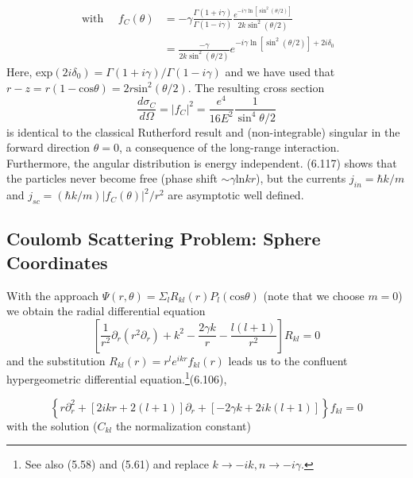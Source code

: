 \begin{equation}
\begin{aligned} \text { with } \quad f_{C}(\theta) &=-\gamma \frac{\Gamma(1+i \gamma)}{\Gamma(1-i \gamma)} \frac{e^{-i \gamma \ln \left[\sin ^{2}(\theta / 2)\right]}}{2 k \sin ^{2}(\theta / 2)} \\ &=\frac{-\gamma}{2 k \sin ^{2}(\theta / 2)} e^{-i \gamma \ln \left[\sin ^{2}(\theta / 2)\right]+2 i \delta_{0}} \end{aligned}
\end{equation}
Here, exp$ (2i\delta_0) = \Gamma (1 + i\gamma) / \Gamma (1 - i\gamma)$ and we have used that $r - z = r (1 - \text{cos} \theta) = 2r \text{sin}^2 (\theta / 2)$. The resulting cross section
\begin{equation}
    \frac{d \sigma_{C}}{d \Omega}=\left|f_{C}\right|^{2}=\frac{e^{4}}{16 E^{2}} \frac{1}{\sin ^{4} \theta / 2}
    \end{equation}
is identical to the classical Rutherford result and (non-integrable) singular in the forward direction $\theta = 0$, a consequence of the long-range interaction. Furthermore, the angular distribution is energy independent. (6.117) shows that the particles never become free (phase shift $\sim\gamma \text{ln} kr$), but the currents $j_{in} = \hbar k / m$ and $j_{sc} = (\hbar k / m) | f_C (\theta) |^2 / r^2$ are asymptotic well defined.

\subsection{Coulomb Scattering Problem: Sphere Coordinates}
With the approach $\Psi (r, \theta) = \Sigma_l R_{kl} (r) P_l (\text{cos}\theta)$ (note that we choose $m = 0$) we obtain the radial differential equation
\begin{equation}
    \left[\frac{1}{r^{2}} \partial_{r}\left(r^{2} \partial_{r}\right)+k^{2}-\frac{2 \gamma k}{r}-\frac{l(l+1)}{r^{2}}\right] R_{k l}=0
    \end{equation}
and the substitution $R_{kl} (r) = r^le^{ikr}f_{kl} (r)$ leads us to the confluent hypergeometric differential equation.\footnote{See also (5.58) and (5.61) and replace $k \rightarrow -ik, n \rightarrow -i\gamma$.}(6.106),

\begin{equation}
    \left\{r \partial_{r}^{2}+[2 i k r+2(l+1)] \partial_{r}+[-2 \gamma k+2 i k(l+1)]\right\} f_{k l}=0
    \end{equation}
with the solution ($C_{kl}$ the normalization constant)

